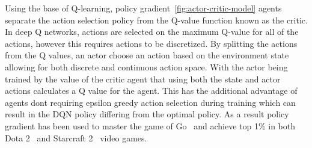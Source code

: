 Using the base of Q-learning, policy gradient~\ref{fig:actor-critic-model} agents separate the action selection policy
from the Q-value function known as the critic. In deep Q networks, actions are selected on the maximum Q-value for all
of the actions, however this requires actions to be discretized. By splitting the actions from the Q values, an actor
choose an action based on the environment state allowing for both discrete and continuous action space. With the
actor being trained by the value of the critic agent that using both the state and actor actions calculates a Q value
for the agent. This has the additional advantage of agents dont requiring epsilon greedy action selection during
training which can result in the DQN policy differing from the optimal policy. As a result policy gradient has been
used to master the game of Go~\citep{silver2017mastering} and achieve top 1\% in both
Dota 2~\citep{OpenAI_dota} and Starcraft 2~\citep{starcraft2} video games.